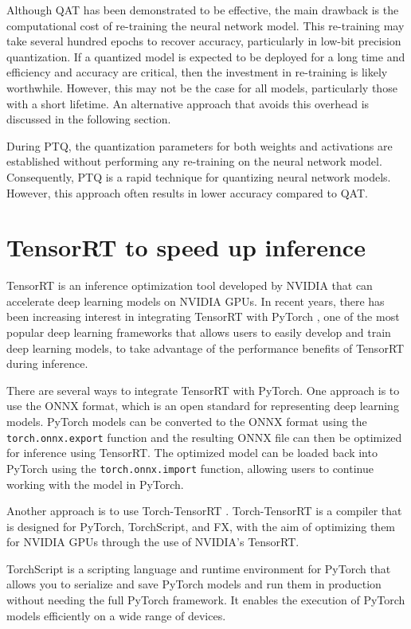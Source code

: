 Although QAT has been demonstrated to be effective, the main drawback is the computational cost of re-training the neural network model. This re-training may take several hundred epochs to recover accuracy, particularly in low-bit precision quantization. If a quantized model is expected to be deployed for a long time and efficiency and accuracy are critical, then the investment in re-training is likely worthwhile. However, this may not be the case for all models, particularly those with a short lifetime. An alternative approach that avoids this overhead is discussed in the following section.

During PTQ, the quantization parameters for both weights and activations are established without performing any re-training on the neural network model. Consequently, PTQ is a rapid technique for quantizing neural network models. However, this approach often results in lower accuracy compared to QAT.

\section{TensorRT to speed up inference}
\label{sec:tensorrt}

TensorRT is an inference optimization tool developed by NVIDIA that can accelerate deep learning models on NVIDIA GPUs. In recent years, there has been increasing interest in integrating TensorRT with PyTorch \cite{NEURIPS2019_9015}, one of the most popular deep learning frameworks that allows users to easily develop and train deep learning models, to take advantage of the performance benefits of TensorRT during inference.
 
There are several ways to integrate TensorRT with PyTorch. One approach is to use the ONNX \cite{bai2019} format, which is an open standard for representing deep learning models. PyTorch models can be converted to the ONNX format using the \texttt{torch.onnx.export} function and the resulting ONNX file can then be optimized for inference using TensorRT. The optimized model can be loaded back into PyTorch using the \texttt{torch.onnx.import} function, allowing users to continue working with the model in PyTorch.

Another approach is to use Torch-TensorRT \cite{torchtensorrt}. Torch-TensorRT is a compiler that is designed for PyTorch, TorchScript, and FX, with the aim of optimizing them for NVIDIA GPUs through the use of NVIDIA's TensorRT.

TorchScript is a scripting language and runtime environment for PyTorch that allows you to serialize and save PyTorch models and run them in production without needing the full PyTorch framework. It enables the execution of PyTorch models efficiently on a wide range of devices.


